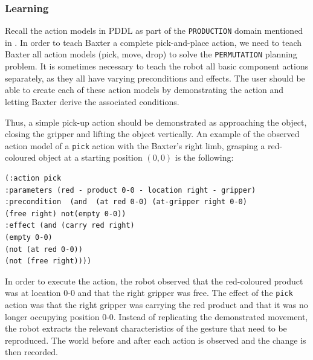 

\subsubsection{Learning}
\label{Create an action model}
Recall the action models in PDDL as part of the \texttt{PRODUCTION} domain mentioned in .
In order to teach Baxter a complete pick-and-place action, we need to teach Baxter all action models (pick, move, drop) to solve the \texttt{PERMUTATION} planning problem.
It is sometimes necessary to teach the robot all basic component actions separately, as they all have varying preconditions and effects.
The user should be able to create each of these action models by demonstrating the action and letting Baxter derive the associated conditions.


Thus, a simple pick-up action should be demonstrated as approaching the object, closing the gripper and lifting the object vertically.
An example of the observed action model of a \texttt{pick} action with the Baxter's right limb, grasping a red-coloured object at a starting position $(0,0)$ is the following:

\begin{verbatim}
(:action pick
:parameters (red - product 0-0 - location right - gripper)
:precondition  (and  (at red 0-0) (at-gripper right 0-0) 
(free right) not(empty 0-0))
:effect (and (carry red right)
(empty 0-0)
(not (at red 0-0)) 
(not (free right))))
\end{verbatim}
In order to execute the action, the robot observed that the red-coloured product was at location 0-0 and that the right gripper was free.
The effect of the \texttt{pick} action was that the right gripper was carrying the red product and that it was no longer occupying position 0-0.
Instead of replicating the demonstrated movement, the robot extracts the relevant characteristics of the gesture that need to be reproduced.
The world before and after each action is observed and the change is then recorded.


